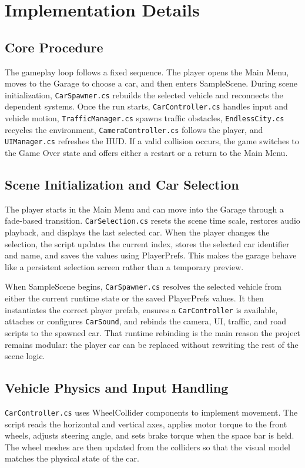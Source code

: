 \documentclass[12pt,a4paper]{article}
\begin{document}
\section{Implementation Details}

\subsection{Core Procedure}
The gameplay loop follows a fixed sequence. The player opens the Main Menu, moves to the Garage to choose a car, and then enters SampleScene. During scene initialization, \texttt{CarSpawner.cs} rebuilds the selected vehicle and reconnects the dependent systems. Once the run starts, \texttt{CarController.cs} handles input and vehicle motion, \texttt{TrafficManager.cs} spawns traffic obstacles, \texttt{EndlessCity.cs} recycles the environment, \texttt{CameraController.cs} follows the player, and \texttt{UIManager.cs} refreshes the HUD. If a valid collision occurs, the game switches to the Game Over state and offers either a restart or a return to the Main Menu.

\subsection{Scene Initialization and Car Selection}
The player starts in the Main Menu and can move into the Garage through a fade-based transition. \texttt{CarSelection.cs} resets the scene time scale, restores audio playback, and displays the last selected car. When the player changes the selection, the script updates the current index, stores the selected car identifier and name, and saves the values using PlayerPrefs. This makes the garage behave like a persistent selection screen rather than a temporary preview.

When SampleScene begins, \texttt{CarSpawner.cs} resolves the selected vehicle from either the current runtime state or the saved PlayerPrefs values. It then instantiates the correct player prefab, ensures a \texttt{CarController} is available, attaches or configures \texttt{CarSound}, and rebinds the camera, UI, traffic, and road scripts to the spawned car. That runtime rebinding is the main reason the project remains modular: the player car can be replaced without rewriting the rest of the scene logic.

\subsection{Vehicle Physics and Input Handling}
\texttt{CarController.cs} uses WheelCollider components to implement movement. The script reads the horizontal and vertical axes, applies motor torque to the front wheels, adjusts steering angle, and sets brake torque when the space bar is held. The wheel meshes are then updated from the colliders so that the visual model matches the physical state of the car.
\end{document}
